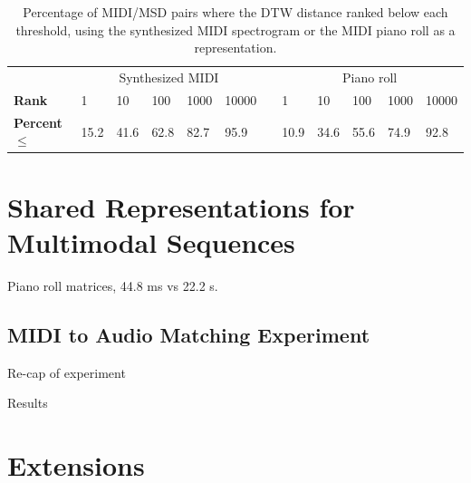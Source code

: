 \documentclass{article} %
\begin{document}
\begin{table}
  \begin{center}
    \begin{tabular}{l l l l l l l l l l l l}
      \toprule
      & \multicolumn{5}{c}{Synthesized MIDI} & &  \multicolumn{5}{c}{Piano roll} \\
      \cmidrule{2-6}
      \cmidrule{8-12}
      \textbf{Rank} & 1 & 10 & 100 & 1000 & 10000 & & 1 & 10 & 100 & 1000 & 10000 \\
      \textbf{Percent $\le$} & 15.2 & 41.6 & 62.8 & 82.7 & 95.9 & & 10.9 & 34.6 & 55.6 & 74.9 & 92.8 \\
      \bottomrule
    \end{tabular}
  \end{center}
  \caption{Percentage of MIDI/MSD pairs where the DTW distance ranked below each threshold, using the synthesized MIDI spectrogram or the MIDI piano roll as a representation.}
  \label{tab:rank-percentages}
\end{table}

\section{Shared Representations for Multimodal Sequences}
\label{sec:multimodal}

Piano roll matrices, 44.8 ms vs 22.2 s.

\subsection{MIDI to Audio Matching Experiment}

Re-cap of experiment

Results

\section{Extensions}


\small

\end{document}
